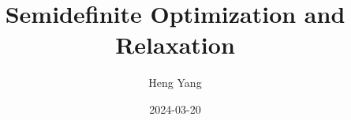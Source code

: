\documentclass[
]{book}
\title{Semidefinite Optimization and Relaxation}
\author{Heng Yang}
\date{2024-03-20}
\theoremstyle{definition}
\theoremstyle{definition}
\theoremstyle{definition}
\theoremstyle{definition}
\theoremstyle{remark}
\begin{document}
\maketitle

{
\setcounter{tocdepth}{1}
\tableofcontents
}
\newcommand{\calG}{\mathcal{G}}
\newcommand{\calV}{\mathcal{V}}
\newcommand{\calE}{\mathcal{E}}
\newcommand{\calF}{\mathcal{F}}
\newcommand{\calP}{\mathcal{P}}
\newcommand{\calQ}{\mathcal{Q}}
\newcommand{\calA}{\mathcal{A}}
\newcommand{\calK}{\mathcal{K}}
\newcommand{\calS}{\mathcal{S}}
\newcommand{\calM}{\mathcal{M}}
\newcommand{\calI}{\mathcal{I}}
\newcommand{\calR}{\mathcal{R}}
\newcommand{\calZ}{\mathcal{Z}}
\newcommand{\mathx}{\mathrm{x}}
\newcommand{\mathy}{\mathrm{y}}
\newcommand{\bbE}{\mathbb{E}}
\newcommand{\calN}{\mathcal{N}}
\newcommand{\tldR}{\tilde{R}}
\newcommand{\bbZ}{\mathbb{Z}}
\newcommand{\bbQ}{\mathbb{Q}}
\newcommand{\bbC}{\mathbb{C}}
\newcommand{\bbF}{\mathbb{F}}
\newcommand{\bbR}{\mathbb{R}}

\newcommand{\Real}[1]{\mathbb{R}^{#1}}
\newcommand{\Comp}[1]{\mathbb{C}^{#1}}
\newcommand{\sym}[1]{\mathbb{S}^{#1}}
\newcommand{\psd}[1]{\sym{#1}_{+}}
\newcommand{\pd}[1]{\sym{#1}_{++}}
\newcommand{\inprod}[2]{\langle #1, #2 \rangle}
\newcommand{\linprod}[2]{\left\langle #1, #2 \right\rangle}
\newcommand{\trace}{\mathrm{tr}}
\newcommand{\tran}{^\top}

\newcommand{\rank}{\mathrm{rank}}
\newcommand{\diag}{\mathrm{diag}}
\newcommand{\Diag}{\mathrm{Diag}}
\newcommand{\BlkDiag}{\mathrm{BlkDiag}}
\newcommand{\vectorize}{\mathrm{vec}}
\newcommand{\svec}{\mathrm{svec}}
\newcommand{\mat}{\mathrm{mat}}
\newcommand{\smat}{\mathrm{smat}}
\newcommand{\norm}[1]{\Vert #1 \Vert}
\newcommand{\lnorm}[1]{\left\Vert #1 \right\Vert}
\newcommand{\pnorm}[2]{\Vert #1 \Vert_{#2}}
\newcommand{\Fnorm}[1]{\Vert #1 \Vert_\mathrm{F}}
\newcommand{\conv}{\mathrm{conv}}
\newcommand{\cone}{\mathrm{cone}}
\newcommand{\interior}{\mathrm{int}}
\newcommand{\relint}{\mathrm{ri}}
\newcommand{\poly}[1]{\mathbb{R}[#1]}
\newcommand{\SOd}{\mathrm{SO}(d)}
\newcommand{\SOthree}{\mathrm{SO}(3)}
\newcommand{\Od}{\mathrm{O}(d)}
\newcommand{\Ogroup}{\mathrm{O}}
\newcommand{\usphere}{\mathcal{S}}
\newcommand{\bmath}[1]{\boldsymbol{#1}}
\newcommand{\lbrkt}{[\![}
\newcommand{\rbrkt}{]\!]}
\newcommand{\brkt}[1]{\lbrkt #1 \rbrkt}
\newcommand{\bracket}[1]{[ #1 ]}
\newcommand{\sign}{\mathrm{sgn}}
\end{document}
